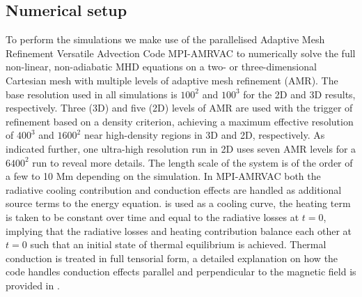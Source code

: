 \subsection{Numerical setup}
To perform the simulations we make use of the parallelised Adaptive Mesh Refinement Versatile Advection Code MPI-AMRVAC \citep{keppens2012_amrvac,porth2014_amrvac,xia2018_amrvac} to numerically solve the full non-linear, non-adiabatic MHD equations on a two- or three-dimensional Cartesian mesh with multiple levels of adaptive mesh refinement (\gls{AMR}). The base resolution used in all simulations is $100^2$ and $100^3$ for the 2D and 3D results, respectively. Three (3D) and five (2D) levels of AMR are used with the trigger of refinement based on a density criterion, achieving a maximum effective resolution of $400^3$ and $1600^2$ near high-density regions in 3D and 2D, respectively. As indicated further, one ultra-high resolution run in 2D uses seven AMR levels for a $6400^2$ run to reveal more details. The length scale of the system is of the order of a few to 10 Mm depending on the simulation. In MPI-AMRVAC both the radiative cooling contribution and conduction effects are handled as additional source terms to the energy equation. \spexdm is used as a cooling curve, the heating term is taken to be constant over time and equal to the radiative losses at $t = 0$, implying that the radiative losses and heating contribution balance each other at $t = 0$ such that an initial state of thermal equilibrium is achieved. Thermal conduction is treated in full tensorial form, a detailed explanation on how the code handles conduction effects parallel and perpendicular to the magnetic field is provided in \citet{xia2018_amrvac}.

